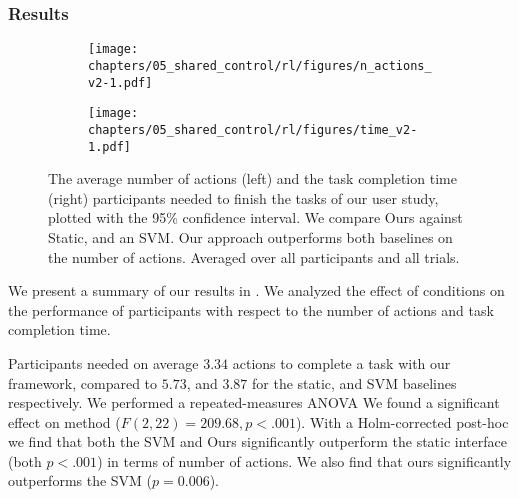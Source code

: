 \subsubsection{Results}
\begin{figure}[!t]
     \centering
     \begin{subfigure}{0.3\columnwidth}
        \centering
        \texttt{[image: chapters/05\_shared\_control/rl/figures/n\_actions\_v2-1.pdf]}
        \label{fig:userstudy_actions}
    \end{subfigure}
    \hspace{0.5cm}
    \begin{subfigure}{0.3\columnwidth}
        \centering
        \texttt{[image: chapters/05\_shared\_control/rl/figures/time\_v2-1.pdf]}
        \label{fig:userstudy_time}
    \end{subfigure}    
    \caption{The average number of actions (left) and the task completion time (right) participants needed to finish the tasks of our user study, plotted with the 95\% confidence interval. We compare Ours against Static, and an SVM. Our approach outperforms both baselines on the number of actions. Averaged over all participants and all trials.}
    \label{fig:userstudy}
\end{figure}

We present a summary of our results in . We analyzed the effect of conditions on the performance of participants with respect to the number of actions and task completion time. 

Participants needed on average $3.34$ actions to complete a task with our framework, compared to $5.73$, and $3.87$ for the static, and SVM baselines respectively.  We performed a repeated-measures ANOVA We found a significant effect on method ($F(2, 22)=209.68, p<.001$). With a Holm-corrected post-hoc we find that both the SVM and Ours significantly outperform the static interface (both $p<.001$) in terms of number of actions. We also find that ours significantly outperforms the SVM ($p=0.006$).  

